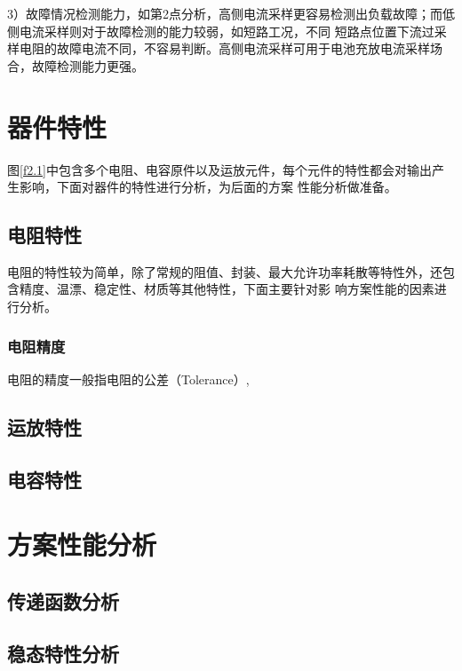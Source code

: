\documentclass[UTF8]{ctexart}
\numberwithin{equation}{section} %
\numberwithin{figure}{section}
\begin{document}
    3）故障情况检测能力，如第2点分析，高侧电流采样更容易检测出负载故障；而低侧电流采样则对于故障检测的能力较弱，如短路工况，不同
    短路点位置下流过采样电阻的故障电流不同，不容易判断。高侧电流采样可用于电池充放电流采样场合，故障检测能力更强。


\section{器件特性}
    图\ref{f2.1}中包含多个电阻、电容原件以及运放元件，每个元件的特性都会对输出产生影响，下面对器件的特性进行分析，为后面的方案
    性能分析做准备。

\subsection{电阻特性}
    电阻的特性较为简单，除了常规的阻值、封装、最大允许功率耗散等特性外，还包含精度、温漂、稳定性、材质等其他特性，下面主要针对影
    响方案性能的因素进行分析。

    \subsubsection{电阻精度}
        电阻的精度一般指电阻的公差（Tolerance）,

\subsection{运放特性}

\subsection{电容特性}

\section{方案性能分析}
\subsection{传递函数分析}

\subsection{稳态特性分析}
\end{document}
